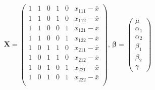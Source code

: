 \documentclass[11pt]{article}
\begin{document}
\[ \mathbf{X} =
\begin{pmatrix}{}
  1  & 1  & 0  & 1  & 0  & x_{111} -\bar{x}\\ 
  1  & 1  & 0  & 1  & 0  & x_{112} -\bar{x}\\ 
  1  & 1  & 0  & 0  & 1  & x_{121} -\bar{x}\\ 
  1  & 1  & 0  & 0  & 1  & x_{122} -\bar{x}\\ 
  1  & 0  & 1  & 1  & 0  & x_{211} -\bar{x}\\ 
  1  & 0  & 1  & 1  & 0  & x_{212} -\bar{x}\\ 
  1  & 0  & 1  & 0  & 1  & x_{221} -\bar{x}\\ 
  1  & 0  & 1  & 0  & 1  & x_{222} -\bar{x}\\ 
  \end{pmatrix},\,
\mathbf{\beta} = \begin{pmatrix} \mu \\ \alpha_1 \\ \alpha_2
\\ \beta_1 \\ \beta_2 \\ \gamma \end{pmatrix}
\]
\end{document}
